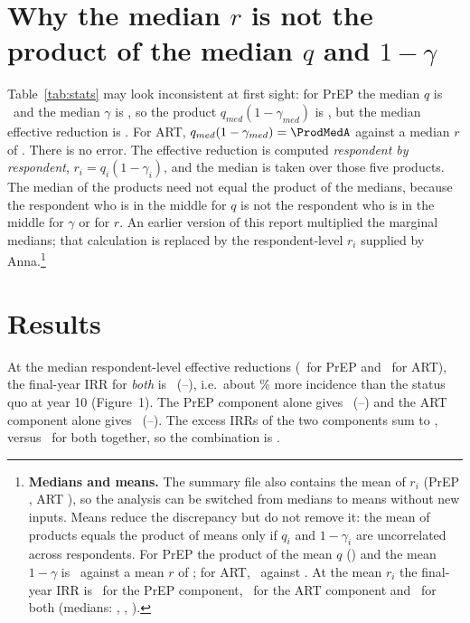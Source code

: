 \documentclass[10pt,a4paper]{article}
\begin{document}
\section{Why the median $r$ is not the product of the median $q$ and $1-\gamma$}\label{sec:medians}
Table~\ref{tab:stats} may look inconsistent at first sight: for PrEP the median $q$ is \QpMed\ and the median $\gamma$ is \GpMed, so the product $q_{med}(1-\gamma_{med})$ is \ProdMedP, but the median effective reduction is \RpMed. For ART, $q_{med}(1-\gamma_{med})=\ProdMedA$ against a median $r$ of \RvMed. There is no error. The effective reduction is computed \emph{respondent by respondent}, $r_i=q_i(1-\gamma_i)$, and the median is taken over those five products. The median of the products need not equal the product of the medians, because the respondent who is in the middle for $q$ is not the respondent who is in the middle for $\gamma$ or for $r$. An earlier version of this report multiplied the marginal medians; that calculation is replaced by the respondent-level $r_i$ supplied by Anna.\footnote{\textbf{Medians and means.} The summary file also contains the mean of $r_i$ (PrEP \MeanRp, ART \MeanRa), so the analysis can be switched from medians to means without new inputs. Means reduce the discrepancy but do not remove it: the mean of products equals the product of means only if $q_i$ and $1-\gamma_i$ are uncorrelated across respondents. For PrEP the product of the mean $q$ (\MeanQp) and the mean $1-\gamma$ is \ProdMeanP\ against a mean $r$ of \MeanRp; for ART, \ProdMeanA\ against \MeanRa. At the mean $r_i$ the final-year IRR is \IrrMeanPrep\ for the PrEP component, \IrrMeanArt\ for the ART component and \IrrMeanBoth\ for both (medians: \IrrPrep, \IrrArt, \IrrBoth).}



\section{Results}

At the median respondent-level effective reductions (\RpMed\ for PrEP and \RvMed\ for ART), the final-year IRR for \emph{both} is \IrrBoth\ (\IrrBothLo--\IrrBothHi), i.e.\ about \IrrBothPct\% more incidence than the status quo at year 10 (Figure~1). The PrEP component alone gives \IrrPrep\ (\IrrPrepLo--\IrrPrepHi) and the ART component alone gives \IrrArt\ (\IrrArtLo--\IrrArtHi). The excess IRRs of the two components sum to \ExcSum, versus \ExcBoth\ for both together, so the combination is \AddPhrase.
\end{document}
